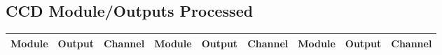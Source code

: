 \subsection{CCD Module/Outputs Processed}

\begin{table}[htb!]
  \begin{tabularx}{\tablewidth}{R R R | R R R | R R R}
    \toprule
    {\bf Module} & {\bf Output} & {\bf Channel} & {\bf Module} & {\bf Output} & {\bf Channel} & {\bf Module} & {\bf Output} & {\bf Channel}\\
    \midrule
    
    \bottomrule
  \end{tabularx}
\end{table} 

\clearpage

